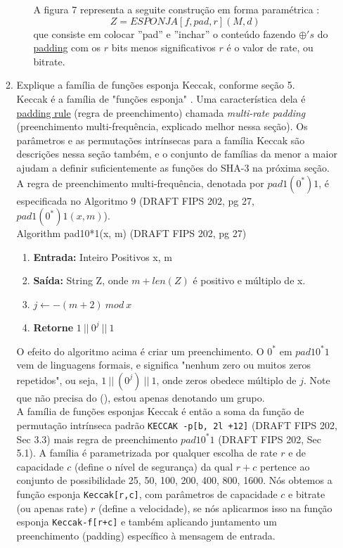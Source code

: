 \documentclass[12pt, a4paper]{article}
\begin{document}
\begin{enumerate}
\begin{enumerate}
\begin{enumerate}
    A figura 7 representa a seguite construção em forma paramétrica
    \cite{gbertoni}: $$Z = ESPONJA[f, pad, r](M, d)$$ que consiste em colocar
    ''pad'' e ''inchar'' o conteúdo fazendo $\oplus's$ do \underline{padding}
    com os $r$ bits menos significativos $r$ é o valor de rate, ou bitrate.\\
  \end{enumerate}

\item Explique a família de funções esponja Keccak, conforme seção 5.\\

Keccak é a família de "funções esponja" \cite{bertoni}. Uma característica dela
é \underline{padding rule} (regra de preenchimento) chamada \textit{multi-rate
padding} (preenchimento multi-frequência, explicado melhor nessa seção). Os
parâmetros e as permutações intrínsecas para a família Keccak são descrições
nessa seção também, e o conjunto de famílias da menor a maior ajudam a definir
suficientemente as funções do SHA-3 na próxima seção.\\

A regra de preenchimento multi-frequência, denotada por $pad1(0^{*})1$, é
especificada no Algoritmo 9 (DRAFT FIPS 202, pg 27, $pad1(0^{*})1(x,m)$).\\

Algorithm pad10*1(x, m) (DRAFT FIPS 202, pg 27)

  \begin{enumerate}
    \item \textbf{Entrada:} Inteiro Positivos x, m
    \item \textbf{Saída:} String Z, onde $m+len(Z)$ é positivo e múltiplo de x.
    \item $j \leftarrow -(m+2)\ mod\ x$
    \item \textbf{Retorne} $1\ ||\ 0^{j}\ ||\ 1$\\
  \end{enumerate}

O efeito do algoritmo acima é criar um preenchimento. O $0^{*}$ em $pad10^{*}1$
vem de linguagens formais, e significa "nenhum zero ou muitos zeros repetidos",
ou seja, $1\ ||\ (0^{j})\ ||\ 1$, onde zeros obedece múltiplo de $j$. Note que
não precisa do (), estou apenas denotando um grupo.\\

A família de funções esponjas Keccak é então a soma da função de permutação
intrínseca padrão \verb|KECCAK -p[b, 2l +12]| (DRAFT FIPS 202, Sec 3.3) mais
regra de preenchimento $pad10^{*}1$ (DRAFT FIPS 202, Sec 5.1). A família é
parametrizada por qualquer escolha de rate $r$ e de capacidade $c$ (define o
nível de segurança) da qual $r+c$ pertence ao conjunto de possibilidade {25, 50,
100, 200, 400, 800, 1600}. Nós obtemos a função esponja \verb|Keccak[r,c]|, com
parâmetros de capacidade $c$ e bitrate (ou apenas rate) $r$ (define a
velocidade), se nós aplicarmos isso na função esponja \verb|Keccak-f[r+c]| e
também aplicando juntamento um preenchimento (padding) específico à mensagem de
entrada.\\


\end{enumerate}
\end{enumerate}
\end{document}

